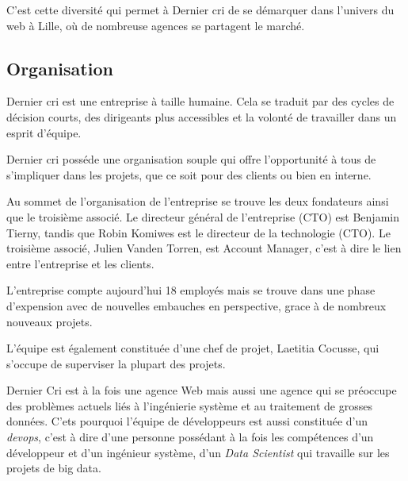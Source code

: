 \documentclass[12pt,a4paper]{article}
\begin{document}
  \bigskip

  C'est cette diversité qui permet à Dernier cri de se démarquer dans
  l'univers du web à Lille, où de nombreuse agences se partagent le
  marché.

  \bigskip

  \subsection{Organisation}\label{organisation}

  \bigskip

  Dernier cri est une entreprise à taille humaine. Cela se traduit par des
  cycles de décision courts, des dirigeants plus accessibles et la volonté
  de travailler dans un esprit d'équipe.

  \bigskip

  Dernier cri posséde une organisation souple qui offre l'opportunité à
  tous de s'impliquer dans les projets, que ce soit pour des clients ou
  bien en interne.

  \bigskip

  Au sommet de l'organisation de l'entreprise se trouve les deux
  fondateurs ainsi que le troisième associé. Le directeur général de
  l'entreprise (CTO) est Benjamin Tierny, tandis que Robin Komiwes est le
  directeur de la technologie (CTO). Le troisième associé, Julien Vanden
  Torren, est Account Manager, c'est à dire le lien entre l'entreprise et
  les clients.

  \bigskip

  L'entreprise compte aujourd'hui 18 employés mais se trouve dans une
  phase d'expension avec de nouvelles embauches en perspective, grace à de
  nombreux nouveaux projets.

  \bigskip

  L'équipe est également constituée d'une chef de projet, Laetitia
  Cocusse, qui s'occupe de superviser la plupart des projets.

  \bigskip

  Dernier Cri est à la fois une agence Web mais aussi une agence qui se
  préoccupe des problèmes actuels liés à l'ingénierie système et au
  traitement de grosses données. C'ets pourquoi l'équipe de développeurs
  est aussi constituée d'un \emph{devops}, c'est à dire d'une personne
  possédant à la fois les compétences d'un développeur et d'un ingénieur
  système, d'un \emph{Data Scientist} qui travaille sur les projets de big
  data.

  \bigskip
\end{document}

